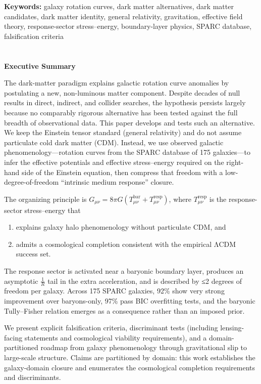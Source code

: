 \textbf{Keywords:} galaxy rotation curves, dark matter alternatives, dark matter candidates, dark matter identity, general relativity, gravitation, effective field theory, response-sector stress--energy, boundary-layer physics, SPARC database, falsification criteria

\section{}\label{section}

\textbf{Executive Summary}

The dark-matter paradigm explains galactic rotation curve anomalies by postulating a new, non-luminous matter component. Despite decades of null results in direct, indirect, and collider searches, the hypothesis persists largely because no comparably rigorous alternative has been tested against the full breadth of observational data. This paper develops and tests such an alternative. We keep the Einstein tensor standard (general relativity) and do not assume particulate cold dark matter (CDM). Instead, we use observed galactic phenomenology---rotation curves from the SPARC database of 175 galaxies---to infer the effective potentials and effective stress--energy required on the right-hand side of the Einstein equation, then compress that freedom with a low-degree-of-freedom ``intrinsic medium response'' closure.

The organizing principle is \(G_{\mu\nu} = 8\pi G\left( T_{\mu\nu}^{\text{bar}} + T_{\mu\nu}^{\text{resp}} \right)\), where \(T_{\mu\nu}^{\text{resp}}\) is the response-sector stress--energy that

\begin{enumerate}
\def\labelenumi{(\roman{enumi})}
\item
  explains galaxy halo phenomenology without particulate CDM, and
\item
  admits a cosmological completion consistent with the empirical ΛCDM success set.
\end{enumerate}

The response sector is activated near a baryonic boundary layer, produces an asymptotic \(\frac{1}{R}\) tail in the extra acceleration, and is described by ≤2 degrees of freedom per galaxy. Across 175 SPARC galaxies, 92\% show very strong improvement over baryons-only, 97\% pass BIC overfitting tests, and the baryonic Tully--Fisher relation emerges as a consequence rather than an imposed prior.

We present explicit falsification criteria, discriminant tests (including lensing-facing statements and cosmological viability requirements), and a domain-partitioned roadmap from galaxy phenomenology through gravitational slip to large-scale structure. Claims are partitioned by domain: this work establishes the galaxy-domain closure and enumerates the cosmological completion requirements and discriminants.

